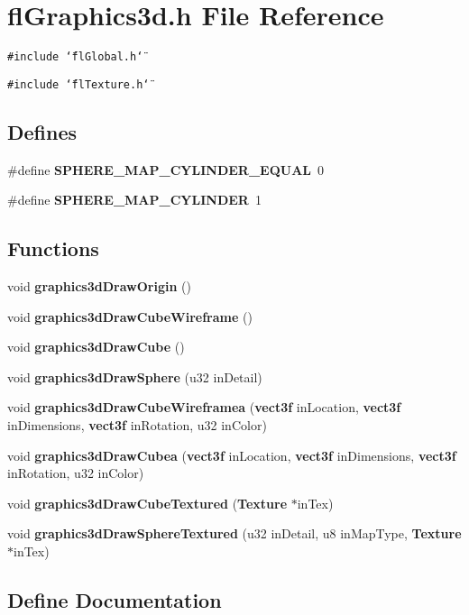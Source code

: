 \section{fl\-Graphics3d.h File Reference}
\label{flGraphics3d_8h}
{\tt \#include \char`\"{}fl\-Global.h\char`\"{}}\par
{\tt \#include \char`\"{}fl\-Texture.h\char`\"{}}\par
\subsection*{Defines}
\begin{CompactItemize}
\item 
\#define {\bf SPHERE\_\-MAP\_\-CYLINDER\_\-EQUAL}~0
\item 
\#define {\bf SPHERE\_\-MAP\_\-CYLINDER}~1
\end{CompactItemize}
\subsection*{Functions}
\begin{CompactItemize}
\item 
void {\bf graphics3d\-Draw\-Origin} ()
\item 
void {\bf graphics3d\-Draw\-Cube\-Wireframe} ()
\item 
void {\bf graphics3d\-Draw\-Cube} ()
\item 
void {\bf graphics3d\-Draw\-Sphere} (u32 in\-Detail)
\item 
void {\bf graphics3d\-Draw\-Cube\-Wireframea} ({\bf vect3f} in\-Location, {\bf vect3f} in\-Dimensions, {\bf vect3f} in\-Rotation, u32 in\-Color)
\item 
void {\bf graphics3d\-Draw\-Cubea} ({\bf vect3f} in\-Location, {\bf vect3f} in\-Dimensions, {\bf vect3f} in\-Rotation, u32 in\-Color)
\item 
void {\bf graphics3d\-Draw\-Cube\-Textured} ({\bf Texture} $\ast$in\-Tex)
\item 
void {\bf graphics3d\-Draw\-Sphere\-Textured} (u32 in\-Detail, u8 in\-Map\-Type, {\bf Texture} $\ast$in\-Tex)
\end{CompactItemize}


\subsection{Define Documentation}
